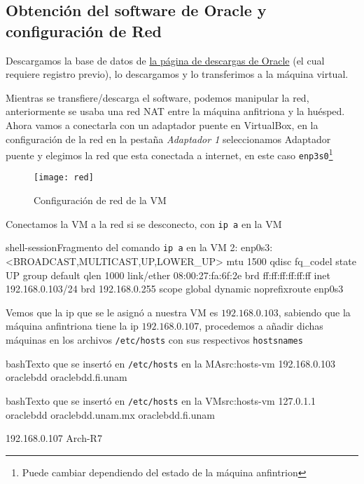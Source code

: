 \documentclass[./main.tex]{subfiles}
\begin{document}
\renewcommand{\thesubsubsection}{{\color{red}C\arabic{subsubsection}}}

\subsection{Obtención del software de Oracle y configuración de Red}\label{sec:obtenc-del-soft}
Descargamos la base de datos de
\href{https://www.oracle.com/database/technologies/oracle-database-software-downloads.html}
{la página de descargas de Oracle} (el cual requiere registro previo), lo descargamos y lo
transferimos a la máquina virtual.


Mientras se transfiere/descarga el software, podemos manipular la red, anteriormente se usaba una
red NAT entre la máquina anfitriona y la huésped. Ahora vamos a conectarla con un adaptador puente
en VirtualBox, en la configuración de la red en la pestaña \textit{Adaptador 1} seleccionamos
Adaptador puente y elegimos la red que esta conectada a internet, en este caso \texttt{enp3s0}\footnote{Puede
  cambiar dependiendo del estado de la máquina anfintrion}
\begin{figure}[H]
  \centering
  \texttt{[image: red]}
  \caption{Configuración de red de la VM}\label{fig:red}
\end{figure}

Conectamos la VM a la red si se desconecto, con \texttt{ip a} en la VM
\begin{codeC}{shell-session}{Fragmento del comando \texttt{ip a} en la VM}
2: enp0s3: <BROADCAST,MULTICAST,UP,LOWER_UP> mtu 1500 qdisc fq_codel state UP group default qlen 1000
    link/ether 08:00:27:fa:6f:2e brd ff:ff:ff:ff:ff:ff
    inet 192.168.0.103/24 brd 192.168.0.255 scope global dynamic noprefixroute enp0s3
\end{codeC}

Vemos que la ip que se le asignó a nuestra VM es $192.168.0.103$, sabiendo que la máquina anfintriona
tiene la ip $192.168.0.107$, procedemos a añadir dichas máquinas en los archivos \texttt{/etc/hosts}
con sus respectivos \texttt{hostsnames}
\begin{codeCL}{bash}{Texto que se insertó en \texttt{/etc/hosts} en la MA}{src:hosts-vm}
192.168.0.103 oraclebdd oraclebdd.fi.unam
\end{codeCL}
\begin{codeCL}{bash}{Texto que se insertó en \texttt{/etc/hosts} en la VM}{src:hosts-vm}
127.0.1.1 oraclebdd oraclebdd.unam.mx oraclebdd.fi.unam

192.168.0.107 Arch-R7
\end{codeCL}
\end{document}
